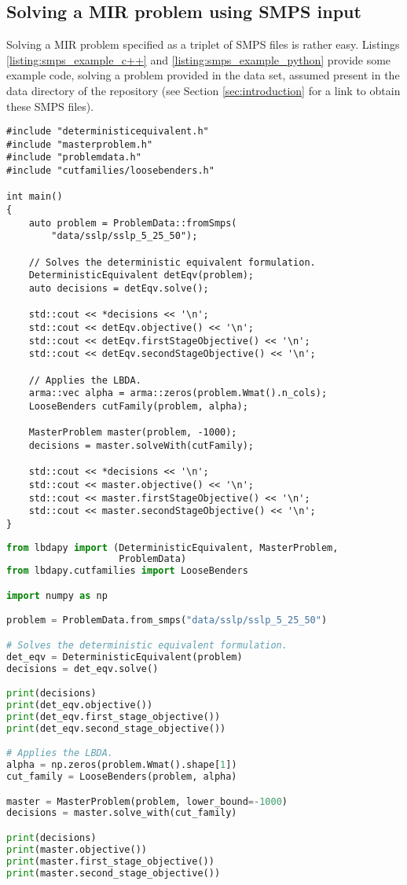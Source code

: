 \documentclass[12pt, english]{article}
\begin{document}
\subsection{Solving a MIR problem using SMPS input}
\label{subsec:solving_smps_example}

Solving a MIR problem specified as a triplet of SMPS files is rather easy. Listings \ref{listing:smps_example_c++} and \ref{listing:smps_example_python} provide some example code, solving a problem provided in the data set, assumed present in the data directory of the repository (see Section \ref{sec:introduction} for a link to obtain these SMPS files).
\begin{lstlisting}[caption={Solving MIR using SMPS input in C++.},
                   label={listing:smps_example_c++}]
#include "deterministicequivalent.h"
#include "masterproblem.h"
#include "problemdata.h"
#include "cutfamilies/loosebenders.h"

int main()
{
	auto problem = ProblemData::fromSmps(
		"data/sslp/sslp_5_25_50");
	
	// Solves the deterministic equivalent formulation.
	DeterministicEquivalent detEqv(problem);
	auto decisions = detEqv.solve();
	
	std::cout << *decisions << '\n';
	std::cout << detEqv.objective() << '\n';
	std::cout << detEqv.firstStageObjective() << '\n';
	std::cout << detEqv.secondStageObjective() << '\n';
	
	// Applies the LBDA.
	arma::vec alpha = arma::zeros(problem.Wmat().n_cols);
	LooseBenders cutFamily(problem, alpha);
	
	MasterProblem master(problem, -1000);
	decisions = master.solveWith(cutFamily);
	
	std::cout << *decisions << '\n';
	std::cout << master.objective() << '\n';
	std::cout << master.firstStageObjective() << '\n';
	std::cout << master.secondStageObjective() << '\n';
}
\end{lstlisting}
\begin{lstlisting}[caption={Solving MIR using SMPS input in Python.},
                   label={listing:smps_example_python},
                   language={Python}]
from lbdapy import (DeterministicEquivalent, MasterProblem, 
                    ProblemData)
from lbdapy.cutfamilies import LooseBenders

import numpy as np

problem = ProblemData.from_smps("data/sslp/sslp_5_25_50")

# Solves the deterministic equivalent formulation.
det_eqv = DeterministicEquivalent(problem)
decisions = det_eqv.solve()

print(decisions)
print(det_eqv.objective())
print(det_eqv.first_stage_objective())
print(det_eqv.second_stage_objective())

# Applies the LBDA.
alpha = np.zeros(problem.Wmat().shape[1])
cut_family = LooseBenders(problem, alpha)

master = MasterProblem(problem, lower_bound=-1000)
decisions = master.solve_with(cut_family)

print(decisions)
print(master.objective())
print(master.first_stage_objective())
print(master.second_stage_objective())
\end{lstlisting}
\end{document}

